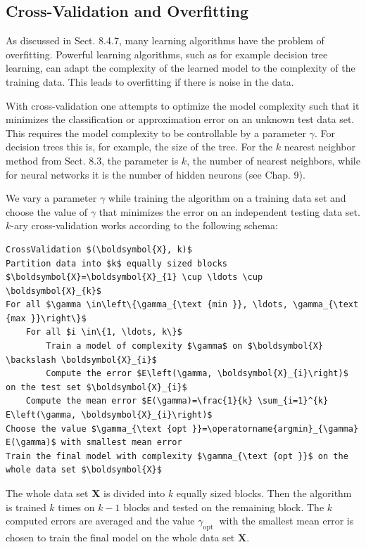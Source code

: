 \documentclass[10pt]{book}
\begin{document}
\subsection{Cross-Validation and Overfitting}
As discussed in Sect. 8.4.7, many learning algorithms have the problem of overfitting. Powerful learning algorithms, such as for example decision tree learning, can adapt the complexity of the learned model to the complexity of the training data. This leads to overfitting if there is noise in the data.

With cross-validation one attempts to optimize the model complexity such that it minimizes the classification or approximation error on an unknown test data set. This requires the model complexity to be controllable by a parameter $\gamma$. For decision trees this is, for example, the size of the tree. For the $k$ nearest neighbor method from Sect. 8.3, the parameter is $k$, the number of nearest neighbors, while for neural networks it is the number of hidden neurons (see Chap. 9).

We vary a parameter $\gamma$ while training the algorithm on a training data set and choose the value of $\gamma$ that minimizes the error on an independent testing data set. $k$-ary cross-validation works according to the following schema:

\begin{verbatim}
CrossValidation $(\boldsymbol{X}, k)$
Partition data into $k$ equally sized blocks $\boldsymbol{X}=\boldsymbol{X}_{1} \cup \ldots \cup \boldsymbol{X}_{k}$
For all $\gamma \in\left\{\gamma_{\text {min }}, \ldots, \gamma_{\text {max }}\right\}$
    For all $i \in\{1, \ldots, k\}$
        Train a model of complexity $\gamma$ on $\boldsymbol{X} \backslash \boldsymbol{X}_{i}$
        Compute the error $E\left(\gamma, \boldsymbol{X}_{i}\right)$ on the test set $\boldsymbol{X}_{i}$
    Compute the mean error $E(\gamma)=\frac{1}{k} \sum_{i=1}^{k} E\left(\gamma, \boldsymbol{X}_{i}\right)$
Choose the value $\gamma_{\text {opt }}=\operatorname{argmin}_{\gamma} E(\gamma)$ with smallest mean error
Train the final model with complexity $\gamma_{\text {opt }}$ on the whole data set $\boldsymbol{X}$
\end{verbatim}

The whole data set $\boldsymbol{X}$ is divided into $k$ equally sized blocks. Then the algorithm is trained $k$ times on $k-1$ blocks and tested on the remaining block. The $k$ computed errors are averaged and the value $\gamma_{\text {opt }}$ with the smallest mean error is chosen to train the final model on the whole data set $\boldsymbol{X}$.
\end{document}
